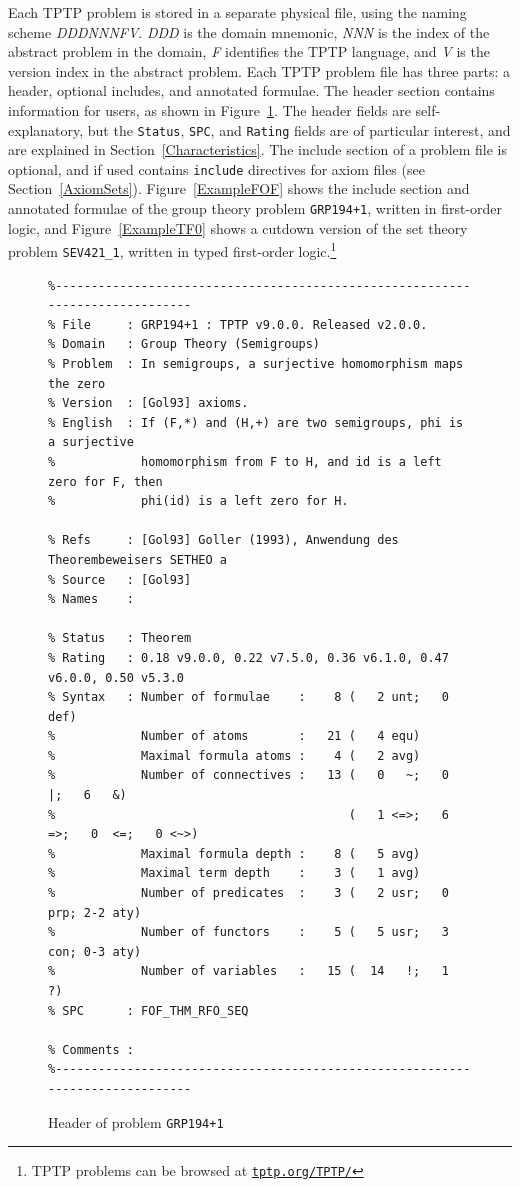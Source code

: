 \documentclass[runningheads]{llncs}
\begin{document}
Each TPTP problem is stored in a separate physical file, using the naming scheme {\em DDDNNNFV}.
{\em DDD} is the domain mnemonic, {\em NNN} is the index of the abstract problem in the domain,
{\em F} identifies the TPTP language, and {\em V} is the version index in the abstract problem.
Each TPTP problem file has three parts: a header, optional includes, and annotated formulae.
The header section contains information for users, as shown in Figure~\ref{ExampleHeader}.
The header fields are self-explanatory, but the {\tt Status}, {\tt SPC}, and {\tt Rating} fields
are of particular interest, and are explained in Section~\ref{Characteristics}.
The include section of a problem file is optional, and if used contains {\tt include} directives 
for axiom files (see Section~\ref{AxiomSets}).
Figure~\ref{ExampleFOF} shows the include section and annotated formulae of the group theory 
problem {\tt GRP194+1}, written in first-order logic, and Figure~\ref{ExampleTF0} shows a cutdown 
version of the set theory problem {\tt SEV421\_1}, written in typed first-order logic.\footnote{%
TPTP problems can be browsed at \href{https://tptp.org/TPTP/}{{\tt tptp.org/TPTP/}}}

\begin{figure}[htb]
\centering
{\scriptsize
{\setlength{\baselineskip}{2.5mm}
\begin{verbatim}
%------------------------------------------------------------------------------
% File     : GRP194+1 : TPTP v9.0.0. Released v2.0.0.
% Domain   : Group Theory (Semigroups)
% Problem  : In semigroups, a surjective homomorphism maps the zero
% Version  : [Gol93] axioms.
% English  : If (F,*) and (H,+) are two semigroups, phi is a surjective
%            homomorphism from F to H, and id is a left zero for F, then 
%            phi(id) is a left zero for H.

% Refs     : [Gol93] Goller (1993), Anwendung des Theorembeweisers SETHEO a
% Source   : [Gol93]
% Names    :

% Status   : Theorem
% Rating   : 0.18 v9.0.0, 0.22 v7.5.0, 0.36 v6.1.0, 0.47 v6.0.0, 0.50 v5.3.0
% Syntax   : Number of formulae    :    8 (   2 unt;   0 def)
%            Number of atoms       :   21 (   4 equ)
%            Maximal formula atoms :    4 (   2 avg)
%            Number of connectives :   13 (   0   ~;   0   |;   6   &)
%                                         (   1 <=>;   6  =>;   0  <=;   0 <~>)
%            Maximal formula depth :    8 (   5 avg)
%            Maximal term depth    :    3 (   1 avg)
%            Number of predicates  :    3 (   2 usr;   0 prp; 2-2 aty)
%            Number of functors    :    5 (   5 usr;   3 con; 0-3 aty)
%            Number of variables   :   15 (  14   !;   1   ?)
% SPC      : FOF_THM_RFO_SEQ

% Comments :
%------------------------------------------------------------------------------
\end{verbatim}
}}
\caption{Header of problem {\tt GRP194+1}}
\label{ExampleHeader}
\end{figure}
\end{document}
